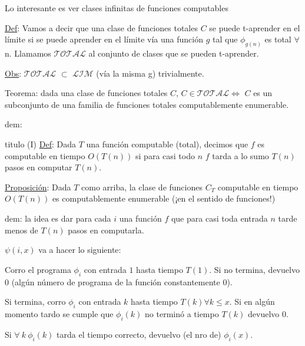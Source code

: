 \documentclass[10pt]{beamer}
\begin{document}
\begin{frame}{Lo interesante es ver clases infinitas de funciones computables}

\underline{Def}: Vamos a decir que una clase de funciones totales $C$ se puede t-aprender en el límite si se puede aprender en el límite vía una función $g$ tal que $\phi_{g(n)}$ es total $\forall$ n. Llamamos $\mathcal{TOTAL}$ al conjunto de clases que se pueden t-aprender.


\underline{Obs}: $\mathcal{TOTAL}$ $\subset$ $\mathcal{LIM}$ (vía la misma g) trivialmente.

\end{frame}


\begin{frame}
	Teorema: dada una clase de funciones totales $C$, $C \in \mathcal{TOTAL} \Leftrightarrow$ $C$ es un subconjunto de una familia de funciones totales computablemente enumerable.
	
	dem: %
\end{frame}


\begin{frame}{titulo (I)}
	\underline{Def}: Dada $T$ una función computable (total), decimos que $f$ es computable en tiempo $O(T(n))$ si para casi todo $n$ $f$ tarda a lo sumo $T(n)$ pasos en computar $T(n)$.
	
	\underline{Proposición}: Dada $T$ como arriba, la clase de funciones $C_T$ computable en tiempo $O(T(n))$ es computablemente enumerable (¡en el sentido de funciones!)
	
	dem: la idea es dar para cada $i$ una función $f$ que para casi toda entrada $n$ tarde menos de $T(n)$ pasos en computarla.
	
	$\psi(i,x)$ va a hacer lo siguiente:
	
	
	
	Corro el programa $\phi_i$ con entrada $1$ hasta tiempo $T(1)$. Si no termina, devuelvo $0$ (algún número de programa de la función constantemente $0$).
	
	Si termina, corro $\phi_i$ con entrada $k$ hasta tiempo $T(k) \forall k \leq x$. Si en algún momento tardo se cumple que $\phi_i(k)$ no terminó a tiempo $T(k)$ devuelvo $0$.
	
	Si $\forall\ k\ \phi_i(k)$ tarda el tiempo correcto, devuelvo  (el nro de) $\phi_i(x)$.
	
	
	
\end{frame}
\end{document}
